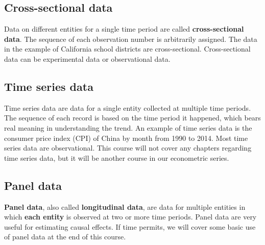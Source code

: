 \documentclass[a4paper,11pt]{article}
\begin{document}
\subsection*{Cross-sectional data}
\label{sec:orgf0df436}

Data on different entities for a single time period are called
\textbf{cross-sectional data}. The sequence of each observation number is
arbitrarily assigned. The data in the example of California school
districts are cross-sectional. Cross-sectional data can be
experimental data or observational data. 


\subsection*{Time series data}
\label{sec:org3d52383}

Time series data are data for a single entity collected at multiple
time periods. The sequence of each record is based on the time period
it happened, which bears real meaning in understanding the trend. An
example of time series data is the consumer price index (CPI) of China
by month from 1990 to 2014. Most time series data are
observational. This course will not cover any chapters regarding time
series data, but it will be another course in our econometric series. 


\subsection*{Panel data}
\label{sec:org9e04857}

\textbf{Panel data}, also called \textbf{longitudinal data}, are data for multiple
entities in which \textbf{each entity} is observed at two or more time
periods. Panel data are very useful for estimating causal effects. If
time permits, we will cover some basic use of panel data at the end of
this course. 
\end{document}
